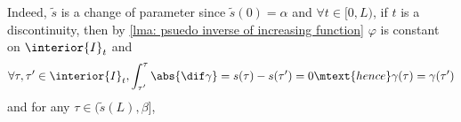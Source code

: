 Indeed, $\tilde{s}$ is a change of parameter since $\tilde{s}(0) = \alpha$ and $\forall t\in[0,L)$,
if $t$ is a discontinuity,
then by \cref{lma: psuedo inverse of increasing function} $\varphi$ is constant on $\interior{I}_t$ and
\begin{equation*}
	\forall \tau, \tau'\in \interior{I}_t,
	\int^{\tau}_{\tau'} \abs{\dif \gamma} = s(\tau)-s(\tau') = 0 \mtext{hence} \gamma(\tau) = \gamma(\tau')
\end{equation*}  and for any
$\tau\in (\tilde{s}(L), \beta]$,

